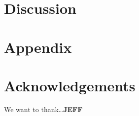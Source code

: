 \documentclass[submit]{smj}
\begin{document}
\section{Discussion}

\section{Appendix}
\section*{Acknowledgements}
We want to thank\ldots \textbf{JEFF}



\end{document}
